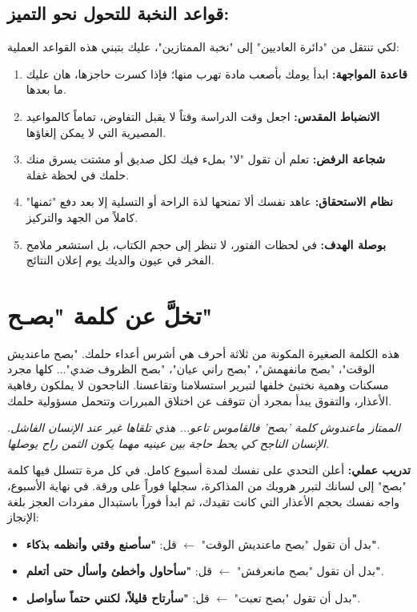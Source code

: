 \documentclass[12pt,a4paper]{book}
\newcommand{\quoteAr}[1]{%
	\begin{myquote}
		\itshape #1
	\end{myquote}
}
\newcommand{\exerciseAr}[1]{%
	\begin{exercise}
		\textbf{تدريب عملي:} #1
	\end{exercise}
}
\begin{document}
	\subsection*{قواعد النخبة للتحول نحو التميز:}
	لكي تنتقل من "دائرة العاديين" إلى "نخبة الممتازين"، عليك بتبني هذه القواعد العملية:
	
	\begin{enumerate}
		\item \textbf{قاعدة المواجهة:} ابدأ يومك بأصعب مادة تهرب منها؛ فإذا كسرت حاجزها، هان عليك ما بعدها.
		\item \textbf{الانضباط المقدس:} اجعل وقت الدراسة وقتاً لا يقبل التفاوض، تماماً كالمواعيد المصيرية التي لا يمكن إلغاؤها.
		\item \textbf{شجاعة الرفض:} تعلم أن تقول "لا" بملء فيك لكل صديق أو مشتت يسرق منك حلمك في لحظة غفلة.
		\item \textbf{نظام الاستحقاق:} عاهد نفسك ألا تمنحها لذة الراحة أو التسلية إلا بعد دفع "ثمنها" كاملاً من الجهد والتركيز.
		\item \textbf{بوصلة الهدف:} في لحظات الفتور، لا تنظر إلى حجم الكتاب، بل استشعر ملامح الفخر في عيون والديك يوم إعلان النتائج.
	\end{enumerate}
	
	\section{تخلَّ عن كلمة "بصـح"}
	\label{sec:owner-experiences2}
	
	هذه الكلمة الصغيرة المكونة من ثلاثة أحرف هي أشرس أعداء حلمك. "بصح ماعنديش الوقت"، "بصح مانفهمش"، "بصح راني عيان"، "بصح الظروف ضدي"... كلها مجرد مسكنات وهمية نختبئ خلفها لتبرير استسلامنا وتقاعسنا. الناجحون لا يملكون رفاهية الأعذار، والتفوق يبدأ بمجرد أن تتوقف عن اختلاق المبررات وتتحمل مسؤولية حلمك.
	
	\quoteAr{الممتاز ماعندوش كلمة 'بصح' فالقاموس تاعو... هذي تلقاها غير عند الإنسان الفاشل. الإنسان الناجح كي يحط حاجة بين عينيه مهما يكون الثمن راح يوصلها.}
	
	\exerciseAr{
		أعلن التحدي على نفسك لمدة أسبوع كامل. في كل مرة تتسلل فيها كلمة "بصح" إلى لسانك لتبرر هروبك من المذاكرة، سجلها فوراً على ورقة. في نهاية الأسبوع، واجه نفسك بحجم الأعذار التي كانت تقيدك، ثم ابدأ فوراً باستبدال مفردات العجز بلغة الإنجاز:
		\begin{itemize}
			\item بدل أن تقول "بصح ماعنديش الوقت" $\leftarrow$ قل: \textbf{"سأصنع وقتي وأنظمه بذكاء"}.
			\item بدل أن تقول "بصح مانعرفش" $\leftarrow$ قل: \textbf{"سأحاول وأخطئ وأسأل حتى أتعلم"}.
			\item بدل أن تقول "بصح تعبت" $\leftarrow$ قل: \textbf{"سأرتاح قليلاً، لكنني حتماً سأواصل"}.
		\end{itemize}
	}
\end{document}
